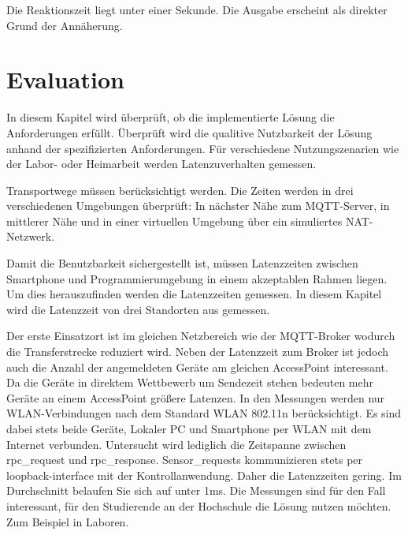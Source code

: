 \documentclass[11pt,a4paper]{report}
\begin{document}
Die Reaktionszeit liegt unter einer Sekunde.
Die Ausgabe erscheint als direkter Grund der Annäherung.


\chapter{Evaluation}\label{chap:eval}
In diesem Kapitel wird überprüft, ob die implementierte Lösung die Anforderungen erfüllt.
Überprüft wird die qualitive Nutzbarkeit der Lösung anhand der spezifizierten Anforderungen.
Für verschiedene Nutzungszenarien wie der Labor- oder Heimarbeit werden Latenzuverhalten gemessen.

Transportwege müssen berücksichtigt werden.
Die Zeiten werden in drei verschiedenen Umgebungen überprüft: In nächster Nähe zum MQTT-Server, in mittlerer Nähe und in einer virtuellen Umgebung über ein simuliertes NAT-Netzwerk.

Damit die Benutzbarkeit sichergestellt ist, müssen Latenzzeiten zwischen Smartphone und Programmierumgebung in einem akzeptablen Rahmen liegen.
Um dies herauszufinden werden die Latenzzeiten gemessen.
In diesem Kapitel wird die Latenzzeit von drei Standorten aus gemessen.

Der erste Einsatzort ist im gleichen Netzbereich wie der MQTT-Broker wodurch die Transferstrecke reduziert wird.
Neben der Latenzzeit zum Broker ist jedoch auch die Anzahl der angemeldeten Geräte am gleichen AccessPoint interessant.
Da die Geräte in direktem Wettbewerb um Sendezeit stehen bedeuten mehr Geräte an einem AccessPoint größere Latenzen.
In den Messungen werden nur WLAN-Verbindungen nach dem Standard WLAN 802.11n berücksichtigt.
Es sind dabei stets beide Geräte, Lokaler PC und Smartphone per WLAN mit dem Internet verbunden.
Untersucht wird lediglich die Zeitspanne zwischen rpc\_request und rpc\_response.
Sensor\_requests kommunizieren stets per loopback-interface mit der Kontrollanwendung.
Daher die Latenzzeiten gering.
Im Durchschnitt belaufen Sie sich auf unter 1ms.
Die Messungen sind  für den Fall interessant, für den Studierende an der Hochschule die Lösung nutzen möchten.
Zum Beispiel in Laboren.
\end{document}
